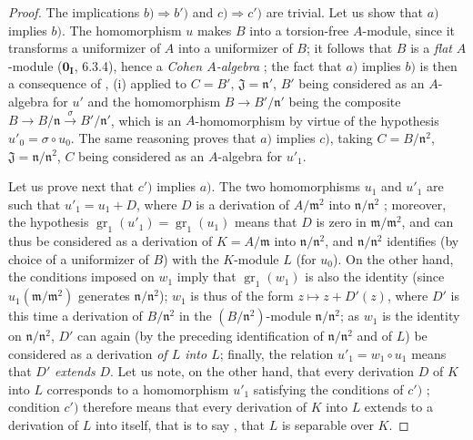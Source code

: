 \begin{proof}
The implications $b)\Rightarrow b')$ and $c)\Rightarrow c')$ are trivial.
Let us show that $a)$ implies $b)$.
The homomorphism $u$ makes $B$ into a torsion-free $A$-module, since it transforms a uniformizer of $A$ into a uniformizer of $B$; it follows that $B$ is a \emph{flat} $A$-module ($\mathbf{0_I}$, 6.3.4), hence a \emph{Cohen $A$-algebra} ; the fact that $a)$ implies $b)$ is then a consequence of , (i) applied to $C=B'$, $\mathfrak{J}=\mathfrak{n}'$, $B'$ being considered as an $A$-algebra for $u'$ and the homomorphism $B\to B'/\mathfrak{n}'$ being the composite $B\to B/\mathfrak{n}\xrightarrow{\sigma} B'/\mathfrak{n}'$, which is an $A$-homomorphism by virtue of the hypothesis $u'_0=\sigma\circ u_0$.
The same reasoning proves that $a)$ implies $c)$, taking $C=B/\mathfrak{n}^2$, $\mathfrak{J}=\mathfrak{n}/\mathfrak{n}^2$, $C$ being considered as an $A$-algebra for $u'_1$.

Let us prove next that $c')$ implies $a)$.
The two homomorphisms $u_1$ and $u'_1$ are such that $u'_1=u_1+D$, where $D$ is a derivation of $A/\mathfrak{m}^2$ into $\mathfrak{n}/\mathfrak{n}^2$ ; moreover, the hypothesis $\operatorname{gr}_1(u'_1)=\operatorname{gr}_1(u_1)$ means that $D$ is zero in $\mathfrak{m}/\mathfrak{m}^2$, and can thus be considered as a derivation of $K=A/\mathfrak{m}$ into $\mathfrak{n}/\mathfrak{n}^2$, and $\mathfrak{n}/\mathfrak{n}^2$ identifies (by choice of a uniformizer of $B$) with the $K$-module $L$ (for $u_0$).
On the other hand, the conditions imposed on $w_1$ imply that $\operatorname{gr}_1(w_1)$ is also the identity (since $u_1(\mathfrak{m}/\mathfrak{m}^2)$ generates $\mathfrak{n}/\mathfrak{n}^2$);
$w_1$ is thus of the form $z\mapsto z+D'(z)$, where $D'$ is this time a derivation of $B/\mathfrak{n}^2$ in the $(B/\mathfrak{n}^2)$-module $\mathfrak{n}/\mathfrak{n}^2$; as $w_1$ is the identity on $\mathfrak{n}/\mathfrak{n}^2$, $D'$ can again (by the preceding identification of $\mathfrak{n}/\mathfrak{n}^2$ and of $L$) be considered as a derivation \emph{of $L$ into $L$};
finally, the relation $u'_1=w_1\circ u_1$ means that $D'$ \emph{extends} $D$.
Let us note, on the other hand, that every derivation $D$ of $K$ into $L$ corresponds to a homomorphism $u'_1$ satisfying the conditions of $c')$ ; condition $c')$ therefore means that every derivation of $K$ into $L$ extends to a derivation of $L$ into itself, that is to say , that $L$ is separable over $K$.


\end{proof}
